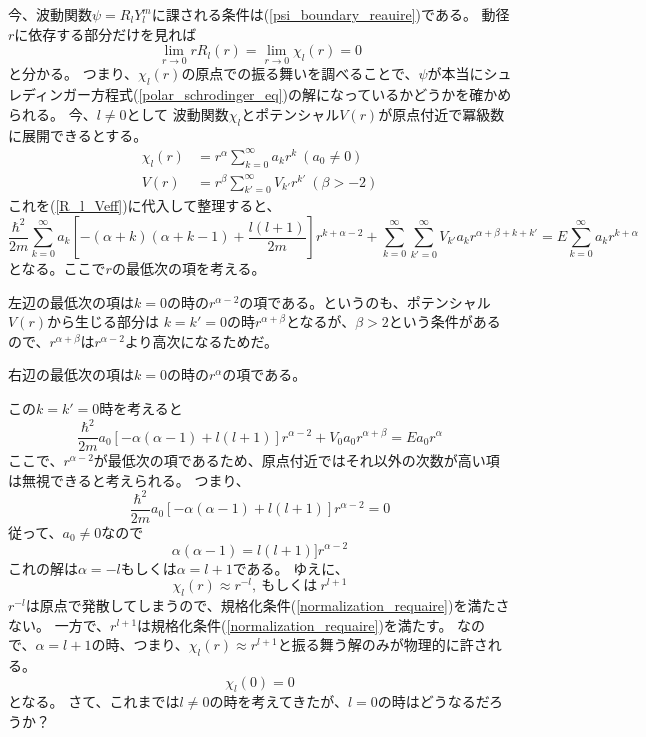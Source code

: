 \documentclass[a4paper,16pt]{jsarticle}
\begin{document}
今、波動関数$\psi = R_lY_l^m$に課される条件は(\ref{psi_boundary_reauire})である。
動径$r$に依存する部分だけを見れば
\begin{equation}
	\label{normalization_requaire}
	\lim_{r \to 0}rR_l(r) = \lim_{r \to 0}\chi_l(r) = 0
\end{equation}
と分かる。
つまり、$\chi_l(r)$の原点での振る舞いを調べることで、$\psi$が本当にシュレディンガー方程式(\ref{polar_schrodinger_eq})の解になっているかどうかを確かめられる。
今、$l \neq 0$として
波動関数$\chi_l$とポテンシャル$V(r)$が原点付近で冪級数に展開できるとする。
\begin{align}
	\chi_l(r) &= r^\alpha\sum_{k=0}^\infty a_kr^k ~ (a_0 \neq 0) \\
	V(r) &= r^\beta\sum_{k'=0}^\infty V_{k'}r^{k'} ~ (\beta > -2)
\end{align}
これを(\ref{R_l_Veff})に代入して整理すると、
\begin{equation}
	\dfrac{\hbar^2}{2m}\sum_{k=0}^\infty a_k
	\left[
		-(\alpha+k)(\alpha+k-1) + \dfrac{l(l+1)}{2m}
	\right]r^{k+\alpha-2}
	+ \sum_{k=0}^\infty \sum_{k'=0}^\infty V_{k'}a_k r^{\alpha+\beta+k+k'}
	= E\sum_{k=0}^\infty a_k r^{k+\alpha}
\end{equation}
となる。ここで$r$の最低次の項を考える。

左辺の最低次の項は$k = 0$の時の$r^{\alpha-2}$の項である。というのも、ポテンシャル$V(r)$から生じる部分は
$k = k' = 0$の時$r^{\alpha+\beta}$となるが、$\beta > 2$という条件があるので、$r^{\alpha+\beta}$は$r^{\alpha-2}$より高次になるためだ。

右辺の最低次の項は$k = 0$の時の$r^\alpha$の項である。

この$k = k' = 0$時を考えると
\begin{equation}
	\dfrac{\hbar^2}{2m}a_0 [-\alpha(\alpha-1)+l(l+1)]r^{\alpha-2} + V_0a_0r^{\alpha+\beta} = Ea_0r^\alpha
\end{equation}
ここで、$r^{\alpha-2}$が最低次の項であるため、原点付近ではそれ以外の次数が高い項は無視できると考えられる。
つまり、
\begin{equation}
	\dfrac{\hbar^2}{2m}a_0 [-\alpha(\alpha-1)+l(l+1)]r^{\alpha-2} = 0
\end{equation}
従って、$a_0 \neq 0$なので
\begin{equation}
	\alpha(\alpha-1) = l(l+1)]r^{\alpha-2}
\end{equation}
これの解は$\alpha = -l$もしくは$\alpha = l+1$である。
ゆえに、
\begin{equation}
	\chi_l(r) \approx r^{-l},~もしくは~r^{l+1}
\end{equation}
$r^{-l}$は原点で発散してしまうので、規格化条件(\ref{normalization_requaire})を満たさない。
一方で、$r^{l+1}$は規格化条件(\ref{normalization_requaire})を満たす。
なので、$\alpha = l+1$の時、つまり、$\chi_l(r) \approx r^{l+1}$と振る舞う解のみが物理的に許される。
\begin{equation}
	\chi_l(0) = 0
\end{equation}
となる。
さて、これまでは$l \neq 0$の時を考えてきたが、$l = 0$の時はどうなるだろうか？
\end{document}

